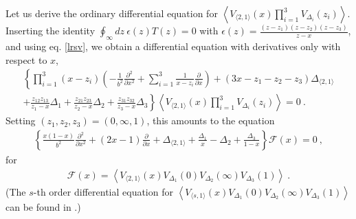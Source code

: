 \documentclass[12pt, a4paper, notitlepage, twoside]{report}
\numberwithin{equation}{section}
\theoremstyle{break}
\begin{document}
Let us derive the ordinary differential equation for $\left\langle V_{\langle 2,1 \rangle}(x)\prod_{i=1}^3 V_{\Delta_i}(z_i)\right\rangle$.
Inserting the identity $\oint_\infty dz\ \epsilon(z) T(z) =0$ with $\epsilon(z) = \frac{(z-z_1)(z-z_2)(z-z_3)}{z-x}$, and using eq. \eqref{lrsv}, we obtain a differential equation with derivatives only with respect to $x$, 
\begin{multline}
  \left\{ \prod_{i=1}^3(x-z_i)\left(-\frac{1}{b^2}\frac{\partial^2}{\partial x^2} +\sum_{i=1}^3 \frac{1}{x-z_i} {\frac{\partial}{\partial x}} \right) + (3x-z_1-z_2-z_3)\Delta_{\langle 2,1 \rangle} \right.
  \\
\left.  +\frac{z_{12}z_{13}}{z_1-x}\Delta_1 + \frac{z_{21}z_{23}}{z_2-x}\Delta_2+\frac{z_{31}z_{32}}{z_3-x}\Delta_3\right\} 
\left\langle V_{\langle 2,1 \rangle}(x)\prod_{i=1}^3 V_{\Delta_i}(z_i)\right\rangle  = 0\ . 
\end{multline}
Setting $(z_1,z_2,z_3)=(0,\infty,1)$, this amounts to the equation 
\begin{align}
  \left\{ \frac{x(1-x)}{b^2}\frac{\partial^2}{\partial x^2} + (2x-1){\frac{\partial}{\partial x}} +\Delta_{\langle 2,1 \rangle} +\frac{\Delta_1}{x}-\Delta_2 + \frac{\Delta_3}{1-x}\right\} \mathcal{F}(x)=0\ ,
\label{sode}
\end{align}
for 
\begin{align}
 \mathcal{F}(x) = \left\langle V_{\langle 2,1 \rangle}(x)V_{\Delta_1}(0)V_{\Delta_2}(\infty)V_{\Delta_3}(1)\right\rangle\ .
\label{fxv}
 \end{align}
(The $s$-th order differential equation for $\left\langle V_{\langle s,1 \rangle}(x)V_{\Delta_1}(0)V_{\Delta_2}(\infty)V_{\Delta_3}(1)\right\rangle $ can be found in \cite{flno09}.)
\end{document}
